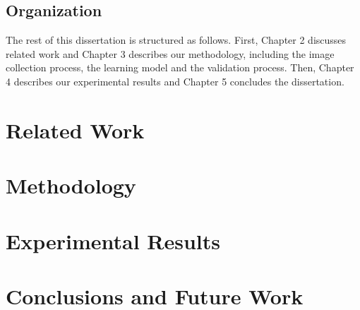 \documentclass[msc]{ppgccufmg}
\begin{document}
\section{Organization}

The rest of this dissertation is structured as follows. First, Chapter 2 discusses related work and Chapter 3 describes our methodology, including the image collection process, the learning model and the validation process. Then, Chapter 4 describes our experimental results and Chapter 5 concludes the dissertation.

\chapter{Related Work}
\chapter{Methodology}
\chapter{Experimental Results}
\chapter{Conclusions and Future Work}

\end{document}
